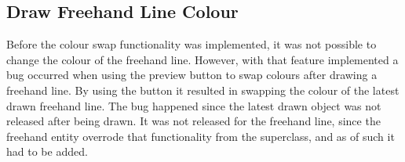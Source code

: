 \subsection{Draw Freehand Line Colour}
Before the colour swap functionality was implemented, it was not possible to change the colour of the freehand line.
However, with that feature implemented a bug occurred when using the preview button to swap colours after drawing a freehand line. 
By using the button it resulted in swapping the colour of the latest drawn freehand line. 
The bug happened since the latest drawn object was not released after being drawn.
It was not released for the freehand line, since the freehand entity overrode that functionality from the superclass, and as of such it had to be added.

